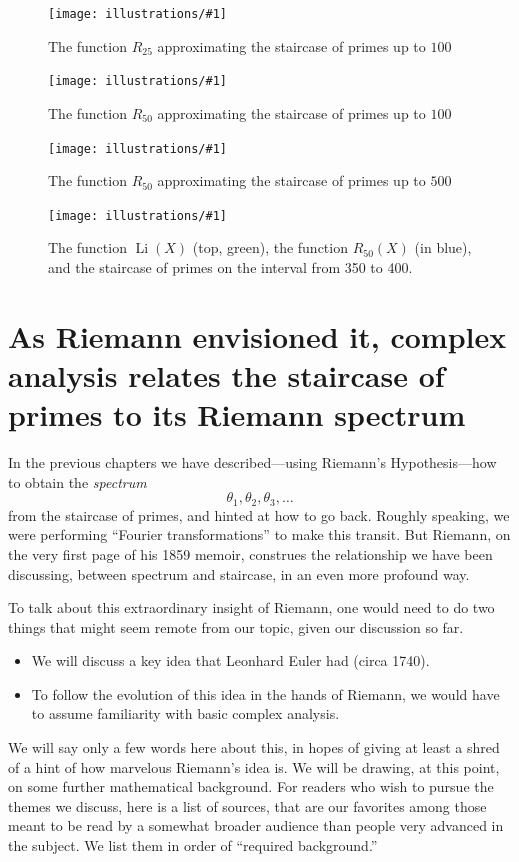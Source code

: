 \documentclass[openany]{book}
\DeclareMathOperator{\Li}{Li}
\newcommand{\ill}[3]{%
   \begin{figure}[H]%
   \vspace{-2ex}
   \centering%
   \texttt{[image: illustrations/\#1]}%
   \caption{#3}%
   \vspace{-2ex}
    \end{figure}}
\theoremstyle{plain}
\theoremstyle{definition}
\begin{document}
{{\ill{Rk_25_2_100}{.9}{The function $R_{25}$ approximating the staircase of primes up to $100$}

\ill{Rk_50_2_100}{.9}{The function $R_{50}$ approximating the staircase of primes up to $100$}


\ill{Rk_50_2_500}{.9}{The function $R_{50}$ approximating the staircase of primes up to $500$}

\ill{Rk_50_350_400}{.9}{The function $\Li(X)$ (top, green), the function $R_{50}(X)$ (in blue), and the staircase of primes on the interval from 350 to 400.\label{fig:rklast}}


\chapter[As Riemann envisioned it]{As Riemann envisioned it, complex analysis relates the staircase of primes to its Riemann spectrum\label{ch:envision}}
In the previous chapters we have described---using Riemann's
Hypothesis---how to obtain the {\it
  spectrum} $$\theta_1,\theta_2,\theta_3,\dots$$ from the staircase of
primes, and hinted at how to go back. Roughly speaking, we were
performing ``Fourier transformations'' to make this transit. But
Riemann, on the very first page of his 1859 memoir, construes the
relationship we have been discussing, between spectrum and staircase,
in an even more profound way.

To talk about this extraordinary insight of Riemann, one would need to
do two things that might seem remote from our topic, given our
discussion so far.

\begin{itemize} \item We will discuss a key idea that Leonhard Euler
  had (circa 1740).
 \item To follow the evolution of this idea in the hands of Riemann, we would have to assume familiarity with basic complex analysis.
 \end{itemize}

 We will say only a few words here about this, in hopes of giving at
 least a shred of a hint of how marvelous Riemann's idea is.  We will be drawing, at this point, on some further mathematical background.  For
 readers who wish to pursue the themes we discuss, here is a list of sources,
 that are our favorites among those meant to be read by a somewhat
 broader audience than people very advanced in the subject. We list
 them in order of ``required background.''

}}
\end{document}
